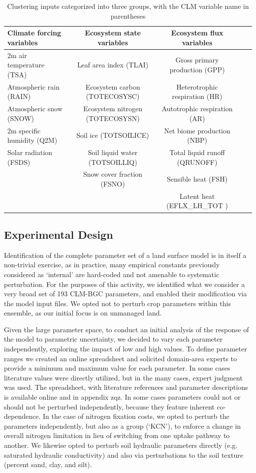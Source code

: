 \documentclass[draft]{agujournal2019}
\begin{document}
\begin{table}[h]
\caption{Clustering inputs categorized into three groups, with the CLM variable name in parentheses}
\centering
\begin{tabular}{l c c c c}
 \hline
 Climate forcing variables & Ecosystem state variables &Ecosystem flux variables \\
 \hline
 2m air temperature (TSA) & Leaf area index (TLAI) & Gross primary production (GPP) \\
Atmospheric rain (RAIN) & Ecosystem carbon (TOTECOSYSC) &Heterotrophic respiration (HR) \\
Atmospheric snow (SNOW) &  Ecosystem nitrogen (TOTECOSYSN) &Autotrophic respiration (AR) \\
2m specific humidity (Q2M) & Soil ice (TOTSOILICE) &Net biome production (NBP) \\
Solar radiation (FSDS) & Soil liquid water (TOTSOILLIQ) & Total liquid runoff (QRUNOFF) \\
& Snow cover fraction (FSNO) & Sensible heat  (FSH) \\
&&Latent heat (EFLX\_LH\_TOT ) \\
 \hline
 \end{tabular}
 \label{tab:sg}
 \end{table}


\subsection{Experimental Design}
Identification of the complete parameter set of a land surface model is in itself a non-trivial exercise, as in practice, many empirical constants previously considered as `internal' are hard-coded and not amenable to systematic perturbation. For the purposes of this activity, we identified what we consider a very broad set of 193 CLM-BGC parameters, and enabled their modification via the model input files. We opted not to perturb crop parameters within this ensemble, as our initial focus is on unmanaged land.

Given the large parameter space, to conduct an initial analysis of the response of the model to parametric uncertainty, we decided to vary each parameter independently, exploring the impact of low and high values. To define parameter ranges we created an online spreadsheet and solicited domain-area experts to provide a minimum and maximum value for each parameter. In some cases literature values were directly utilized, but in the many cases, expert judgment was used. The spreadsheet, with literature references and parameter descriptions is available online and in appendix zqz. In some cases parameters could not or should not be perturbed independently, because they feature inherent co-dependence. In the case of nitrogen fixation costs, we opted to perturb the parameters independently, but also as a group (`KCN'), to enforce a change in overall nitrogen limitation in lieu of switching from one uptake pathway to another. We likewise opted to perturb soil hydraulic parameters directly (e.g. saturated hydraulic conductivity) and also via perturbations to the soil texture (percent sand, clay, and silt).
\end{document}
